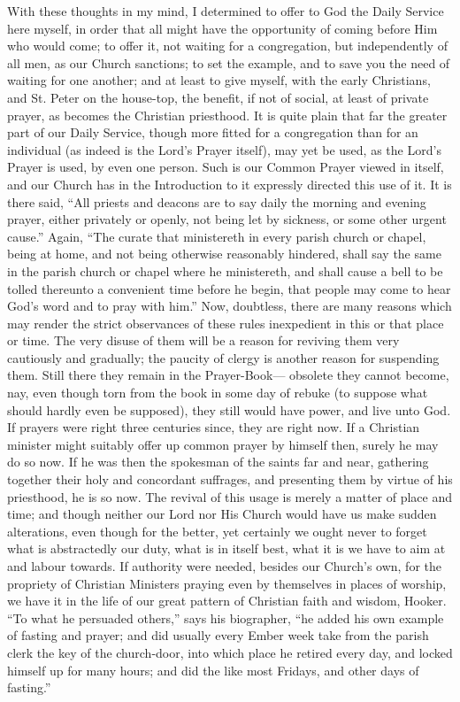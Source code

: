 With these thoughts in my mind, I determined to offer to God the
Daily Service here myself, in order that all might have the
opportunity of coming before Him who would come; to offer it, not
waiting for a congregation, but independently of all men, as our
Church sanctions; to set the example, and to save you the need of
waiting for one another; and at least to give myself, with the early
Christians, and St. Peter on the house-top, the benefit, if not of
social, at least of private prayer, as becomes the Christian
priesthood. It is quite plain that far the greater part of our Daily
Service, though more fitted for a congregation than for an individual
(as indeed is the Lord's Prayer itself), may yet be used, as the
Lord's Prayer is used, by even one person. Such is our Common Prayer
viewed in itself, and our Church has in the Introduction to it
expressly directed this use of it. It is there said, ``All priests
and deacons are to say daily the morning and evening prayer, either
privately or openly, not being let by sickness, or some other urgent
cause.'' Again, ``The curate that ministereth in every parish
church or chapel, being at home, and not being otherwise reasonably
hindered, shall say the same in the parish church or chapel where he
ministereth, and shall cause a bell to be tolled thereunto a
convenient time before he begin, that people may come to hear God's
word and to pray with him.'' Now, doubtless, there are many
reasons which may render the strict observances of these rules
inexpedient in this or that place or time. The very disuse of them
will be a reason for reviving them very cautiously and gradually; the
paucity of clergy is another reason for suspending them. Still there
they remain in the Prayer-Book— obsolete they cannot become, nay,
even though torn from the book in some day of rebuke (to suppose what
should hardly even be supposed), they still would have power, and live
unto God. If prayers were right three centuries since, they are right
now. If a Christian minister might suitably offer up common prayer by
himself then, surely he may do so now. If he was then the spokesman of
the saints far and near, gathering together their holy and concordant
suffrages, and presenting them by virtue of his priesthood, he is so
now. The revival of this usage is merely a matter of place and time;
and though neither our Lord nor His Church would have us make sudden
alterations, even though for the better, yet certainly we ought never
to forget what is abstractedly our duty, what is in itself best, what
it is we have to aim at and labour towards. If authority were needed,
besides our Church's own, for the propriety of Christian Ministers
praying even by themselves in places of worship, we have it in the
life of our great pattern of Christian faith and wisdom, Hooker.
``To what he persuaded others,'' says his biographer, ``he
added his own example of fasting and prayer; and did usually every
Ember week take from the parish clerk the key of the church-door, into
which place he retired every day, and locked himself up for many
hours; and did the like most Fridays, and other days of fasting.''

